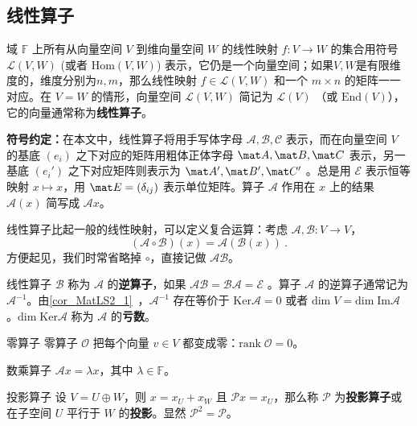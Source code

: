 
\begin{issues}
\issueTODO
\end{issues}


\subsection{线性算子}\label{sub_LiOper_4}

域 $\mathbb{F}$ 上所有从向量空间 $V$ 到维向量空间 $W$ 的线性映射 $f:V\rightarrow W$ 的集合用符号 $\mathcal{L}(V, W)$ (或者 $\mathrm{Hom}(V, W)$) 表示，它仍是一个向量空间；如果$V, W$是有限维度的，维度分别为$n, m$，那么线性映射 $f \in \mathcal{L}(V, W)$ 和一个 $m\times n$ 的矩阵一一对应。在 $V=W$ 的情形，向量空间 $\mathcal{L}(V, W)$ 简记为 $\mathcal{L}(V)$ （或 $\mathrm{End}(V)$），它的向量通常称为\textbf{线性算子}。

\textbf{符号约定：}在本文中，线性算子将用手写体字母 $\mathcal{A,B,C}$ 表示，而在向量空间 $V$ 的基底 $(e_i)$ 之下对应的矩阵用粗体正体字母 $\mat A,\mat B,\mat C$ 表示，另一基底 $(e_i')$ 之下对应矩阵则表示为 $\mat A',\mat B',\mat C'$ 。总是用 $\mathcal{E}$ 表示恒等映射 $x \mapsto x$，用 $\mat E = (\delta_{ij})$ 表示单位矩阵。算子 $\mathcal{A}$ 作用在 $ x$ 上的结果 $\mathcal{A}(x)$ 简写成 $\mathcal{A} x$。

线性算子比起一般的线性映射，可以定义复合运算：考虑 $\mathcal{A}, \mathcal{B}: V \to V$，
\begin{equation}
(\mathcal{A} \circ \mathcal{B})(x) = \mathcal{A} (\mathcal{B}(x))~.
\end{equation}
方便起见，我们时常省略掉 $\circ$，直接记做 $\mathcal{A} \mathcal{B}$。

线性算子 $\mathcal{B}$ 称为 $\mathcal{A}$ 的\textbf{逆算子}，如果 $\mathcal{AB}=\mathcal{BA}=\mathcal{E}$ 。算子 $\mathcal{A}$ 的逆算子通常记为 $\mathcal{A}^{-1}$。由\autoref{cor_MatLS2_1}~，$\mathcal{A}^{-1}$ 存在等价于 $\mathrm{Ker}\mathcal{A}=0$ 或者 $\mathrm{dim}\;V=\mathrm{dim\;Im}\mathcal{A}$ 。$\mathrm{dim\;Ker}\mathcal{A}$ 称为 $\mathcal{A}$ 的\textbf{亏数}。
\begin{example}{零算子}\label{ex_LiOper_1}
零算子 $\mathcal{O}$ 把每个向量 $ v\in V$ 都变成零：$\mathrm{rank}\; \mathcal{O}=0$。
\end{example}
\begin{example}{数乘算子}
$\mathcal{A} x=\lambda x$，其中 $\lambda\in\mathbb{F}$。
\end{example}
\begin{example}{投影算子}
设 $V=U\oplus W$，则 $ x= x_U+ x_W$ 且 $\mathcal{P} x= x_U$，那么称 $\mathcal{P}$ 为\textbf{投影算子}或在子空间 $U$ 平行于 $W$ 的\textbf{投影}。显然 $\mathcal{P}^2=\mathcal{P}$。
\end{example}

